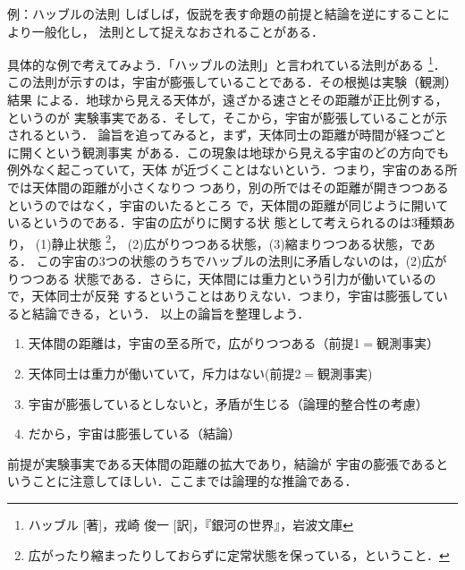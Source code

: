             \begin{memo}{例：ハッブルの法則}
                しばしば，仮説を表す命題の前提と結論を逆にすることにより一般化し，
                法則として捉えなおされることがある．

                具体的な例で考えてみよう．「ハッブルの法則」と言われている法則がある
                    \footnote{
                        ハッブル [著]，戎崎 俊一 [訳]，『銀河の世界』，岩波文庫
                    }．
                この法則が示すのは，宇宙が膨張していることである．その根拠は実験（観測）結果
                による．地球から見える天体が，遠ざかる速さとその距離が正比例する，というのが
                実験事実である．そして，そこから，宇宙が膨張していることが示されるという．
                論旨を追ってみると，まず，天体同士の距離が時間が経つごとに開くという観測事実
                がある．この現象は地球から見える宇宙のどの方向でも例外なく起こっていて，天体
                が近づくことはないという．つまり，宇宙のある所では天体間の距離が小さくなりつ
                つあり，別の所ではその距離が開きつつあるというのではなく，宇宙のいたるところ
                で，天体間の距離が同じように開いているというのである．宇宙の広がりに関する状
                態として考えられるのは3種類あり，
                (1)静止状態
                    \footnote{
                        広がったり縮まったりしておらずに定常状態を保っている，ということ．
                    }，
                (2)広がりつつある状態，(3)縮まりつつある状態，である．
                この宇宙の3つの状態のうちでハッブルの法則に矛盾しないのは，(2)広がりつつある
                状態である．さらに，天体間には重力という引力が働いているので，天体同士が反発
                するということはありえない．つまり，宇宙は膨張していると結論できる，という．
                以上の論旨を整理しよう．
                    \begin{enumerate}
                        \item 天体間の距離は，宇宙の至る所で，広がりつつある（前提1$=$観測事実）
                        \item 天体同士は重力が働いていて，斥力はない(前提2$=$観測事実)
                        \item 宇宙が膨張しているとしないと，矛盾が生じる（論理的整合性の考慮）
                        \item だから，宇宙は膨張している（結論）
                    \end{enumerate}
                前提が実験事実である天体間の距離の拡大であり，結論が
                宇宙の膨張であるということに注意してほしい．ここまでは論理的な推論である．


\end{memo}
